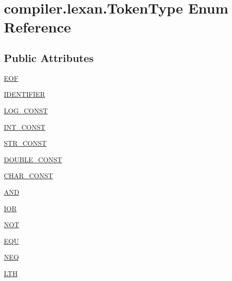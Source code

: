 \hypertarget{enumcompiler_1_1lexan_1_1_token_type}{}\section{compiler.\+lexan.\+Token\+Type Enum Reference}
\label{enumcompiler_1_1lexan_1_1_token_type}
\subsection*{Public Attributes}
\begin{DoxyCompactItemize}
\item 
\hyperlink{enumcompiler_1_1lexan_1_1_token_type_abf0bd65d5261446db4fa92f39ac861d3}{E\+OF}
\item 
\hyperlink{enumcompiler_1_1lexan_1_1_token_type_a73d10f845a630a8a64e3d747fa038b3c}{I\+D\+E\+N\+T\+I\+F\+I\+ER}
\item 
\hyperlink{enumcompiler_1_1lexan_1_1_token_type_acb4e3cc59ea47957922dbcb2d6a8f78b}{L\+O\+G\+\_\+\+C\+O\+N\+ST}
\item 
\hyperlink{enumcompiler_1_1lexan_1_1_token_type_a828275d113ac165e2645aa5ba0a54f58}{I\+N\+T\+\_\+\+C\+O\+N\+ST}
\item 
\hyperlink{enumcompiler_1_1lexan_1_1_token_type_a6622d3833b13b620c3b81727f5ee25d9}{S\+T\+R\+\_\+\+C\+O\+N\+ST}
\item 
\hyperlink{enumcompiler_1_1lexan_1_1_token_type_a69a4c17ec784a9e5dce17841c42e9cdf}{D\+O\+U\+B\+L\+E\+\_\+\+C\+O\+N\+ST}
\item 
\hyperlink{enumcompiler_1_1lexan_1_1_token_type_abad1cba00783f9a61d2ed51f52017e0f}{C\+H\+A\+R\+\_\+\+C\+O\+N\+ST}
\item 
\hyperlink{enumcompiler_1_1lexan_1_1_token_type_a65f8ff9065ce3a4f0864dd386c19cbef}{A\+ND}
\item 
\hyperlink{enumcompiler_1_1lexan_1_1_token_type_aa0277b9ebf04d5258f9613218f593f80}{I\+OR}
\item 
\hyperlink{enumcompiler_1_1lexan_1_1_token_type_a6a14aeeb8dc95ab0057360de6afb9d5b}{N\+OT}
\item 
\hyperlink{enumcompiler_1_1lexan_1_1_token_type_a7d6937dd740e65c1b59e9591fa10b610}{E\+QU}
\item 
\hyperlink{enumcompiler_1_1lexan_1_1_token_type_ad88163a7b789d46fc024c6985f57891a}{N\+EQ}
\item 
\hyperlink{enumcompiler_1_1lexan_1_1_token_type_a43aedd5b2cd8c062f3b866822e352f4e}{L\+TH}
\item 

\end{DoxyCompactItemize}
